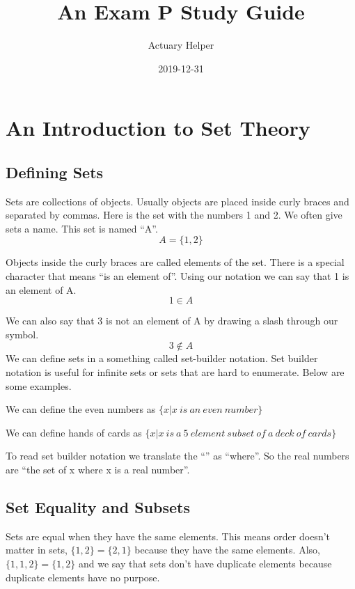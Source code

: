 \documentclass[
]{book}
\title{An Exam P Study Guide}
\author{Actuary Helper}
\date{2019-12-31}
\begin{document}
\frontmatter
\maketitle

{
\setcounter{tocdepth}{1}
\tableofcontents
}
\mainmatter
\hypertarget{an-introduction-to-set-theory}{%
\chapter{An Introduction to Set Theory}\label{an-introduction-to-set-theory}}

\hypertarget{defining-sets}{%
\section{Defining Sets}\label{defining-sets}}

Sets are collections of objects. Usually objects are placed inside curly braces and separated by commas. Here is the set with the numbers 1 and 2. We often give sets a name. This set is named ``A''. \[A=\{1,2\}\]

Objects inside the curly braces are called elements of the set. There is a special character that means ``is an element of''. Using our notation we can say that 1 is an element of A. \[1 \in A\]

We can also say that 3 is not an element of A by drawing a slash through our symbol.
\[3 \not\in A\]
We can define sets in a something called set-builder notation. Set builder notation is useful for infinite sets or sets that are hard to enumerate. Below are some examples.

We can define the even numbers as \(\{x | x \ is \  an \  even \ number\}\)

We can define hands of cards as \(\{x | x \ is \  a \ 5 \ element \ subset \ of \ a \ deck \ of \ cards\}\)

To read set builder notation we translate the ``\textbar{}'' as ``where''. So the real numbers are ``the set of x where x is a real number''.

\hypertarget{set-equality-and-subsets}{%
\section{Set Equality and Subsets}\label{set-equality-and-subsets}}

Sets are equal when they have the same elements. This means order doesn't matter in sets, \(\{1,2\} = \{2,1\}\) because they have the same elements. Also, \(\{1,1,2\} = \{1,2\}\) and we say that sets don't have duplicate elements because duplicate elements have no purpose.
\end{document}
